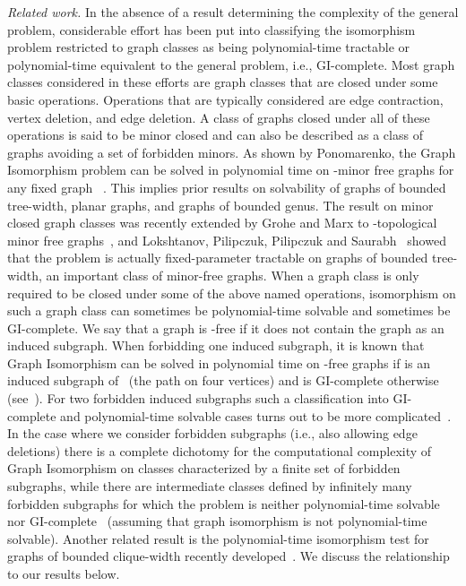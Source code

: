 \documentclass[envcountsame,envcountsect,11pt,a4paper]{llncs}
\begin{document}
{\it Related work.} In the absence of a result determining the complexity of the general problem, considerable effort has been put into
classifying the isomorphism problem restricted to graph classes as being polynomial-time tractable or polynomial-time equivalent to the
general problem, i.e., GI-complete. Most graph classes considered in these efforts are graph classes that are closed under some basic
operations. Operations that are typically considered are edge contraction, vertex deletion, and edge deletion. A class of graphs closed under
all of these operations is said to be minor closed and can also be described as a class of graphs avoiding a set of forbidden minors. As
shown by Ponomarenko, the {\sc Graph Isomorphism} problem can be solved in polynomial time on -minor free graphs for any fixed graph
~\cite{Ponomarenko88}. This implies prior results on solvability of graphs of bounded tree-width, planar graphs, and graphs of
bounded genus. The result on minor closed graph classes was recently extended by Grohe and Marx to -topological minor free
graphs~\cite{GroheM15}, and Lokshtanov, Pilipczuk, Pilipczuk and Saurabh~\cite{LPPS14} showed that the problem is actually fixed-parameter
tractable on graphs of bounded tree-width, an important class of minor-free graphs. When a graph class is only required to be closed under
some of the above named operations, isomorphism on such a graph class can sometimes be polynomial-time solvable and sometimes be
GI-complete. We say that a graph  is -free if it does not contain the graph  as an induced subgraph. When forbidding one induced
subgraph, it is known that {\sc Graph Isomorphism} can be solved in polynomial time on -free graphs if  is an induced subgraph
of~ (the path on four vertices) and is GI-complete otherwise (see~\cite{BoothColbourn1979}).
For two forbidden induced subgraphs such a classification into GI-complete and polynomial-time solvable cases turns out to be
more complicated~\cite{DBLP:conf/wg/KratschS12,stacsSchweitzer}. In the case where we consider forbidden subgraphs (i.e., also allowing edge
deletions) there is a complete dichotomy for the computational complexity of {\sc Graph Isomorphism} on classes characterized by
a finite set of forbidden subgraphs, while there are intermediate classes defined by infinitely many forbidden subgraphs
for which the problem is neither polynomial-time solvable nor GI-complete~\cite{OtachiS13}
(assuming that graph isomorphism is not polynomial-time solvable).
Another related result is the polynomial-time isomorphism test for graphs of bounded clique-width recently developed~\cite{rankwidth}. We discuss the relationship to our results below.
\end{document}
